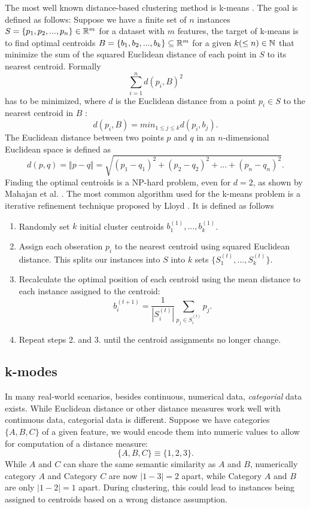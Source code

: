 The most well known distance-based clustering method is k-means \cite{kmeans}. The goal is defined as follows: Suppose we have a finite set of $n$ instances $S=\{p_1, p_2, ..., p_n\} \in \mathbb{R}^m$ for a dataset with $m$ features, the target of k-means is to find optimal centroids $B=\{b_1, b_2, ..., b_k\} \subseteq \mathbb{R}^m$ for a given $k (\leq n) \in \mathbb{N}$ that minimize the sum of the squared Euclidean distance of each point in $S$ to its nearest centroid. Formally
$$\sum_{i=1}^n  d(p_i, B)^2$$
has to be minimized, where $d$ is the Euclidean distance from a point $p_i \in S$ to the nearest centroid in $B$ \cite{kmeans_np_hard}:
$$d(p_i, B) = min_{1 \leq j \leq k} d(p_i, b_j).$$
The Euclidean distance between two points $p$ and $q$ in an $n$-dimensional Euclidean space is defined as 
$$d(p, q) = \Vert p - q \Vert = \sqrt{(p_1 - q_1)^2 + (p_2 - q_2)^2 + ... + (p_n - q_n)^2}.$$
Finding the optimal centroids is a NP-hard problem, even for $d=2$, as shown by Mahajan et al. \cite{kmeans_np_hard}. The most common algorithm used for the k-means problem is a iterative refinement technique proposed by Lloyd \cite{kmeans_lloyd}. It is defined as follows
\begin{enumerate} 
	\item Randomly set $k$ initial cluster centroids $b_1^{(1)}, ..., b_k^{(1)}$.
	\item Assign each obseration $p_i$ to the nearest centroid using squared Euclidean distance. This splits our instances into $S$ into $k$ sets $\{S_1^{(t)}, ..., S_k^{(t)}\}$.
	\item Recalculate the optimal position of each centroid using the mean distance to each instance assigned to the centroid: 
$$b_i^{(t+1)} = \frac{1}{|S_i^{(t)}|} \sum_{p_j \in S_i^{(t)}} p_j.$$
	\item Repeat steps 2. and 3. until the centroid assignments no longer change.
\end{enumerate}

\subsection{k-modes} \label{k-modes}

In many real-world scenarios, besides continuous, numerical data, \textit{categorial} data exists. While Euclidean distance or other distance measures work well with continuous data, categorial data is different. Suppose we have categories $\{A, B, C\}$ of a given feature, we would encode them into numeric values to allow for computation of a distance measure:
$$\{A, B, C\} \equiv \{1, 2, 3\}.$$
While $A$ and $C$ can share the same semantic similarity as $A$ and $B$, numerically category $A$ and Category $C$ are now $|1-3| = 2$ apart, while Category $A$ and $B$ are only $|1-2|=1$ apart. During clustering, this could lead to instances being assigned to centroids based on a wrong distance assumption.

